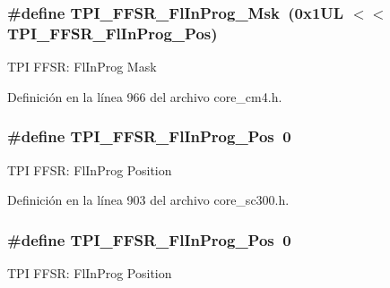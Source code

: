 \subsubsection[{\texorpdfstring{T\+P\+I\+\_\+\+F\+F\+S\+R\+\_\+\+Fl\+In\+Prog\+\_\+\+Msk}{TPI_FFSR_FlInProg_Msk}}]{\setlength{\rightskip}{0pt plus 5cm}\#define T\+P\+I\+\_\+\+F\+F\+S\+R\+\_\+\+Fl\+In\+Prog\+\_\+\+Msk~(0x1\+U\+L $<$$<$ T\+P\+I\+\_\+\+F\+F\+S\+R\+\_\+\+Fl\+In\+Prog\+\_\+\+Pos)}\hypertarget{group___c_m_s_i_s___t_p_i_ga63dfb09259893958962914fc3a9e3824}{}\label{group___c_m_s_i_s___t_p_i_ga63dfb09259893958962914fc3a9e3824}
T\+PI F\+F\+SR\+: Fl\+In\+Prog Mask 

Definición en la línea 966 del archivo core\+\_\+cm4.\+h.

\subsubsection[{\texorpdfstring{T\+P\+I\+\_\+\+F\+F\+S\+R\+\_\+\+Fl\+In\+Prog\+\_\+\+Pos}{TPI_FFSR_FlInProg_Pos}}]{\setlength{\rightskip}{0pt plus 5cm}\#define T\+P\+I\+\_\+\+F\+F\+S\+R\+\_\+\+Fl\+In\+Prog\+\_\+\+Pos~0}\hypertarget{group___c_m_s_i_s___t_p_i_ga542ca74a081588273e6d5275ba5da6bf}{}\label{group___c_m_s_i_s___t_p_i_ga542ca74a081588273e6d5275ba5da6bf}
T\+PI F\+F\+SR\+: Fl\+In\+Prog Position 

Definición en la línea 903 del archivo core\+\_\+sc300.\+h.

\subsubsection[{\texorpdfstring{T\+P\+I\+\_\+\+F\+F\+S\+R\+\_\+\+Fl\+In\+Prog\+\_\+\+Pos}{TPI_FFSR_FlInProg_Pos}}]{\setlength{\rightskip}{0pt plus 5cm}\#define T\+P\+I\+\_\+\+F\+F\+S\+R\+\_\+\+Fl\+In\+Prog\+\_\+\+Pos~0}\hypertarget{group___c_m_s_i_s___t_p_i_ga542ca74a081588273e6d5275ba5da6bf}{}\label{group___c_m_s_i_s___t_p_i_ga542ca74a081588273e6d5275ba5da6bf}
T\+PI F\+F\+SR\+: Fl\+In\+Prog Position 

